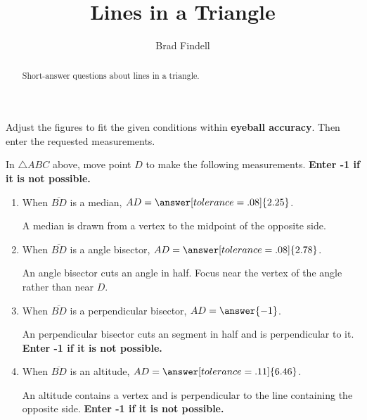 \documentclass[nooutcomes]{ximera}
\title{Lines in a Triangle}
\author{Brad Findell}
\begin{document}
\begin{abstract}
Short-answer questions about lines in a triangle. 
\end{abstract}
\maketitle

Adjust the figures to fit the given conditions within \textbf{eyeball accuracy}.  Then enter the requested measurements.  


\begin{problem}
\begin{center}  
\end{center}
In $\triangle ABC$ above, move point $D$ to make the following measurements.  \textbf{Enter -1 if it is not possible.}   
\begin{enumerate}
\item When $\overline{BD}$ is a median, $AD=\answer[tolerance=.08]{2.25}$.
\begin{hint}
A median is drawn from a vertex to the midpoint of the opposite side.
\end{hint}
\item When $\overline{BD}$ is a angle bisector, $AD=\answer[tolerance=.08]{2.78}$.
\begin{hint}
An angle bisector cuts an angle in half.  Focus near the vertex of the angle rather than near $D$.
\end{hint}
\item When $\overline{BD}$ is a perpendicular bisector, $AD=\answer{-1}$.
\begin{hint}
An perpendicular bisector cuts an segment in half and is perpendicular to it. \textbf{Enter -1 if it is not possible.} 
\end{hint}
\item When $\overline{BD}$ is an altitude, $AD=\answer[tolerance=.11]{6.46}$.
\begin{hint}
An altitude contains a vertex and is perpendicular to the line containing the opposite side. \textbf{Enter -1 if it is not possible.} 
\end{hint}
\end{enumerate}
\end{problem}
\end{document}
